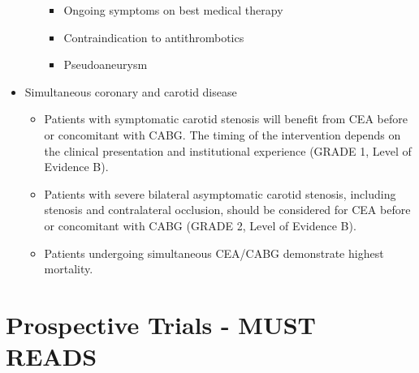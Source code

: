 \documentclass[
]{book}
\begin{document}
\begin{itemize}
\begin{itemize}
    \begin{itemize}
    \item
      Ongoing symptoms on best medical therapy
    \item
      Contraindication to antithrombotics
    \item
      Pseudoaneurysm
    \end{itemize}
  \end{itemize}
\item
  Simultaneous coronary and carotid disease

  \begin{itemize}
  \item
    Patients with symptomatic carotid stenosis will benefit from CEA
    before or concomitant with CABG. The timing of the intervention
    depends on the clinical presentation and institutional
    experience (GRADE 1, Level of Evidence B).
  \item
    Patients with severe bilateral asymptomatic carotid stenosis,
    including stenosis and contralateral occlusion, should be
    considered for CEA before or concomitant with CABG (GRADE 2,
    Level of Evidence B).
  \item
    Patients undergoing simultaneous CEA/CABG demonstrate highest
    mortality. \citep{naylorSystematicReviewOutcomes2003}
  \end{itemize}
\end{itemize}

\hypertarget{prospective-trials---must-reads}{%
\section{Prospective Trials - MUST READS}\label{prospective-trials---must-reads}}
\end{document}
